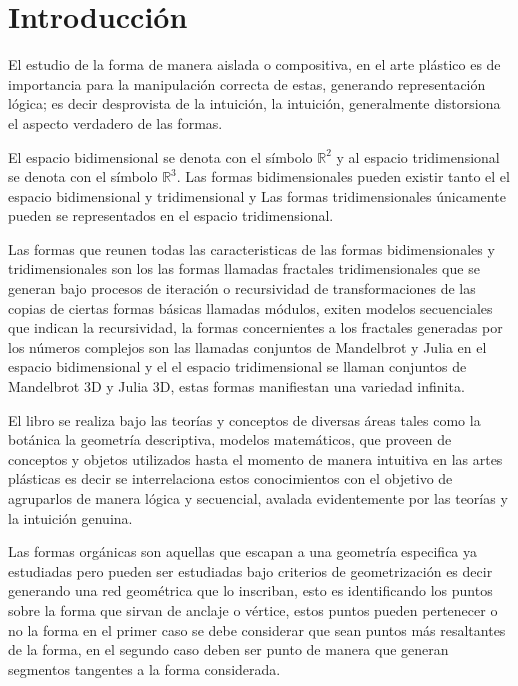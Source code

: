\documentclass[
  16pt,
]{krantz}
\theoremstyle{definition}
\theoremstyle{definition}
\theoremstyle{definition}
\theoremstyle{definition}
\theoremstyle{remark}
\begin{document}
\hypertarget{introducciuxf3n}{%
\chapter*{Introducción}\label{introducciuxf3n}}


El estudio de la forma de manera aislada o compositiva, en el arte plástico es de importancia para la manipulación correcta de estas, generando representación lógica; es decir desprovista de la intuición, la intuición, generalmente distorsiona el aspecto verdadero de las formas.

El espacio bidimensional se denota con el símbolo \(\mathbb{R}^2\) y al espacio tridimensional se denota con el símbolo \(\mathbb{R}^3\). Las formas bidimensionales pueden existir tanto el el espacio bidimensional y tridimensional y Las formas tridimensionales únicamente pueden se representados en el espacio tridimensional.

Las formas que reunen todas las caracteristicas de las formas bidimensionales y tridimensionales son los las formas llamadas fractales tridimensionales que se generan bajo procesos de iteración o recursividad de transformaciones de las copias de ciertas formas básicas llamadas módulos, exiten modelos secuenciales que indican la recursividad, la formas concernientes a los fractales generadas por los números complejos son las llamadas conjuntos de Mandelbrot y Julia en el espacio bidimensional y el el espacio tridimensional se llaman conjuntos de Mandelbrot 3D y Julia 3D, estas formas manifiestan una variedad infinita.

El libro se realiza bajo las teorías y conceptos de diversas áreas tales como la botánica la geometría descriptiva, modelos matemáticos, que proveen de conceptos y objetos utilizados hasta el momento de manera intuitiva en las artes plásticas es decir se interrelaciona estos conocimientos con el objetivo de agruparlos de manera lógica y secuencial, avalada evidentemente por las teorías y la intuición genuina.

Las formas orgánicas son aquellas que escapan a una geometría especifica ya estudiadas pero pueden ser estudiadas bajo criterios de geometrización es decir generando una red geométrica que lo inscriban, esto es identificando los puntos sobre la forma que sirvan de anclaje o vértice, estos puntos pueden pertenecer o no la forma en el primer caso se debe considerar que sean puntos más resaltantes de la forma, en el segundo caso deben ser punto de manera que generan segmentos tangentes a la forma considerada.
\end{document}

